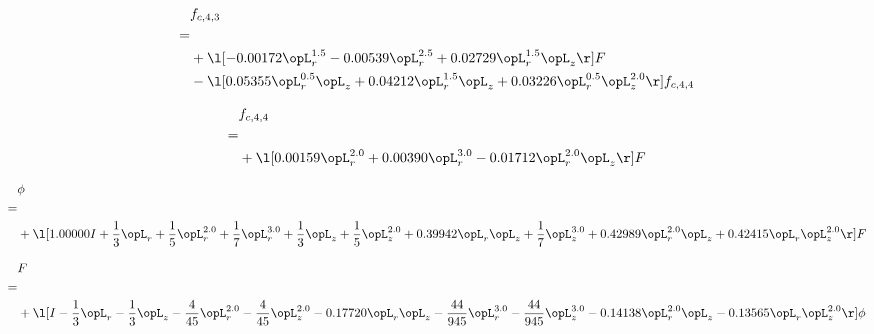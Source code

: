 \begin{alignat}{2} 
\label{eq:f_43_2} 
& f_{c,4,3} \nonumber \\ 
 = \\ 
& + \l[  -0.00172 \opL_r^{1.5}   -0.00539 \opL_r^{2.5} +  0.02729 \opL_r^{1.5} \opL_z  \r] F \nonumber \\ 
& - \l[  0.05355 \opL_r^{0.5} \opL_z +  0.04212 \opL_r^{1.5} \opL_z +  0.03226 \opL_r^{0.5} \opL_z^{2.0}  \r] f_{c,4,4} \nonumber \\ 
\end{alignat} 


\begin{alignat}{2} 
\label{eq:f_44_2} 
& f_{c,4,4} \nonumber \\ 
 = \\ 
& + \l[  0.00159 \opL_r^{2.0} +  0.00390 \opL_r^{3.0}   -0.01712 \opL_r^{2.0} \opL_z  \r] F \nonumber \\ 
\end{alignat} 


\begin{alignat}{2} 
\label{eq:scalarFlux_1} 
& \phi \nonumber \\ 
 = \\ 
& + \l[  1.00000 I + \frac{1}{3} \opL_r + \frac{1}{5} \opL_r^{2.0} + \frac{1}{7} \opL_r^{3.0} + \frac{1}{3} \opL_z + \frac{1}{5} \opL_z^{2.0} +  0.39942 \opL_r \opL_z + \frac{1}{7} \opL_z^{3.0} +  0.42989 \opL_r^{2.0} \opL_z +  0.42415 \opL_r \opL_z^{2.0}  \r] F \nonumber \\ 
\end{alignat} 


\begin{alignat}{2} 
\label{eq:transport3D_0} 
& F \nonumber \\ 
 = \\ 
& + \l[ I - \frac{1}{3} \opL_r - \frac{1}{3} \opL_z - \frac{4}{45} \opL_r^{2.0} - \frac{4}{45} \opL_z^{2.0}   -0.17720 \opL_r \opL_z - \frac{44}{945} \opL_r^{3.0} - \frac{44}{945} \opL_z^{3.0}   -0.14138 \opL_r^{2.0} \opL_z   -0.13565 \opL_r \opL_z^{2.0}  \r] \phi \nonumber \\ 
\end{alignat} 


